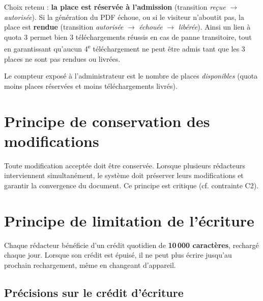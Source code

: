 \begin{hypothesisbox}
Choix retenu : \textbf{la place est réservée à l'admission} (transition \emph{reçue} $\to$ \emph{autorisée}). Si la génération du PDF échoue, ou si le visiteur n'aboutit pas, la place est \textbf{rendue} (transition \emph{autorisée} $\to$ \emph{échouée} $\to$ \emph{libérée}). Ainsi un lien à quota 3 permet bien 3 téléchargements réussis en cas de panne transitoire, tout en garantissant qu'aucun 4\textsuperscript{e} téléchargement ne peut être admis tant que les 3 places ne sont pas rendues ou livrées.
\end{hypothesisbox}

Le compteur exposé à l'administrateur est le nombre de places \emph{disponibles} (quota moins places réservées et moins téléchargements livrés).

\section{Principe de conservation des modifications}
\begin{principebox}
Toute modification acceptée doit être conservée. Lorsque plusieurs rédacteurs interviennent simultanément, le système doit préserver leurs modifications et garantir la convergence du document. Ce principe est critique (cf. contrainte C2).
\end{principebox}

\section{Principe de limitation de l'écriture}
\begin{principebox}
Chaque rédacteur bénéficie d'un crédit quotidien de \textbf{10\,000 caractères}, rechargé chaque jour. Lorsque son crédit est épuisé, il ne peut plus écrire jusqu'au prochain rechargement, même en changeant d'appareil.
\end{principebox}

\subsection{Précisions sur le crédit d'écriture}

